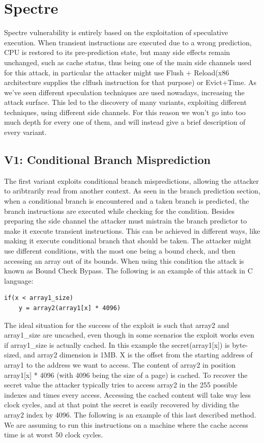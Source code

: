 \section{Spectre}
Spectre vulnerability is entirely based on the exploitation of speculative execution.
When transient instructions are executed due to a wrong prediction, CPU is restored to its pre-prediction state, but many side effects remain unchanged, such as cache status, thus being one of the main side channels used for this attack, in particular the attacker might use Flush + Reload(x86 architecture supplies the clflush instruction for that purpose) or Evict+Time.
As we've seen different speculation techniques are used nowadays, increasing the attack surface.
This led to the discovery of many variants, exploiting different techniques, using different side channels.
For this reason we won't go into too much depth for every one of them, and will instead give a brief description of every variant.

\subsection{V1: Conditional Branch Misprediction}
The first variant exploits conditional branch mispredictions, allowing the attacker to aribtrarily read from another context. As seen in the branch prediction section, when a conditional branch is encountered and a taken branch is predicted, the branch instructions are executed while checking for the condition.
Besides preparing the side channel the attacker must mistrain the branch predictor to make it execute transient instructions.
This can be achieved in different ways, like making it execute conditional branch that should be taken.
The attacker might use different conditions, with the most one being a bound check, and then accessing an array out of its bounds. When using this condition the attack is known as Bound Check Bypass.
The following is an example of this attack in C language:

\begin{Verbatim}[fontsize=\small]
if(x < array1_size)
	y = array2(array1[x] * 4096)
\end{Verbatim}

The ideal situation for the success of the exploit is such that array2 and array1\_size are uncached, even though in some scenarios the exploit works even if array1\_size is actually cached.
In this example the secret(array1[x]) is byte-sized, and array2 dimension is 1MB.
X is the offset from the starting address of array1 to the address we want to access.
The content of array2 in position array1[x] * 4096 (with 4096 being the size of a page) is cached.
To recover the secret value the attacker typically tries to access array2 in the 255 possible indexes and times every access.
Accessing the cached content will take way less clock cycles, and at that point the secret is easily recovered by dividing the array2 index by 4096.
The following is an example of this last described  method. We are assuming to run this instructions on a machine where the cache access time is at worst 50 clock cycles.

